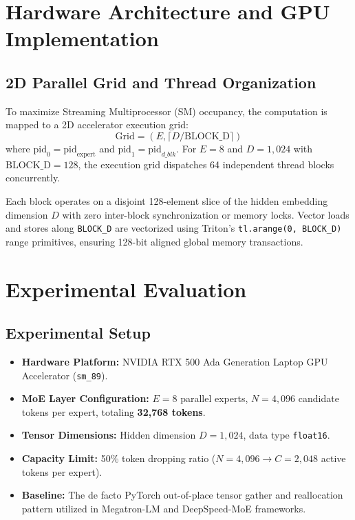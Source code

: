 \documentclass[10pt,twocolumn]{article}
\begin{document}
\section{Hardware Architecture and GPU Implementation}
\label{sec:hardware}

\subsection{2D Parallel Grid and Thread Organization}
To maximize Streaming Multiprocessor (SM) occupancy, the computation is mapped to a 2D accelerator execution grid:
\begin{equation}
    \text{Grid} = (E, \lceil D / \text{BLOCK\_D} \rceil)
\end{equation}
where $\text{pid}_0 = \text{pid}_{\text{expert}}$ and $\text{pid}_1 = \text{pid}_{d\_blk}$. For $E = 8$ and $D = 1,024$ with $\text{BLOCK\_D} = 128$, the execution grid dispatches 64 independent thread blocks concurrently.

Each block operates on a disjoint 128-element slice of the hidden embedding dimension $D$ with zero inter-block synchronization or memory locks. Vector loads and stores along \texttt{BLOCK\_D} are vectorized using Triton's \texttt{tl.arange(0, BLOCK\_D)} range primitives, ensuring 128-bit aligned global memory transactions.

\section{Experimental Evaluation}
\label{sec:eval}

\subsection{Experimental Setup}
\begin{itemize}[nosep, leftmargin=*]
    \item \textbf{Hardware Platform:} NVIDIA RTX 500 Ada Generation Laptop GPU Accelerator (\texttt{sm\_89}).
    \item \textbf{MoE Layer Configuration:} $E = 8$ parallel experts, $N = 4,096$ candidate tokens per expert, totaling \textbf{32,768 tokens}.
    \item \textbf{Tensor Dimensions:} Hidden dimension $D = 1,024$, data type \texttt{float16}.
    \item \textbf{Capacity Limit:} 50\% token dropping ratio ($N = 4,096 \to C = 2,048$ active tokens per expert).
    \item \textbf{Baseline:} The de facto PyTorch out-of-place tensor gather and reallocation pattern utilized in Megatron-LM and DeepSpeed-MoE frameworks.
\end{itemize}
\end{document}
